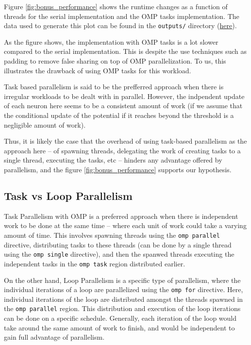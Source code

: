 \documentclass[a4paper,10pt]{article}
\begin{document}
Figure \ref{fig:bonus_performance} shows the runtime changes as a function of threads for the serial implementation and the OMP tasks implementation. The data used to generate this plot can be found in the \verb|outputs/| directory (\href{https://github.com/paulmyr/DD2356-MethodsHPC/blob/master/3_open_mp/bonus/neuron/outputs/neuron_omp_job.results}{here}). 

As the figure shows, the implementation with OMP tasks is a lot slower compared to the serial implementation. This is despite the use techniques such as padding to remove false sharing on top of OMP parallelization. To us, this illustrates the drawback of using OMP tasks for this workload. 

Task based parallelism is said to be the prefferred approach when there is irregular workloads to be dealt with in parallel. However, the indpendent update of each neuron here seems to be a consistent amount of work (if we assume that the conditional update of the potential if it reaches beyond the threshold is a negligible amount of work).

 Thus, it is likely the case that the overhead of using task-based parallelism as the approach here -- of spawning threads, delegating the work of creating tasks to a single thread, executing the tasks, etc -- hinders any advantage offered by parallelism, and the figure \ref{fig:bonus_performance} supports our hypothesis. 

\subsection{Task vs Loop Parallelism}
Task Parallelism with OMP is a preferred approach when there is independent work to be done at the same time -- where each unit of work could take a varying amount of time. This involves spawning threads using the \verb|omp parallel| directive, distributing tasks to these threads (can be done by a single thread using the \verb|omp single| directive), and then the spanwed threads executing the independent tasks in the \verb|omp task| region distributed earlier. 

On the other hand, Loop Parallelism is a specific type of parallelism, where the individual iterations of a loop are parallelized using the \verb|omp for| directive. Here, individual iterations of the loop are distributed amongst the threads spawned in the \verb|omp parallel| region. This distribution and execution of the loop iterations can be done on a specific schedule. Generally, each iteration of the loop would take around the same amount of work to finish, and would be independent to gain full advantage of parallelism.
\end{document}
